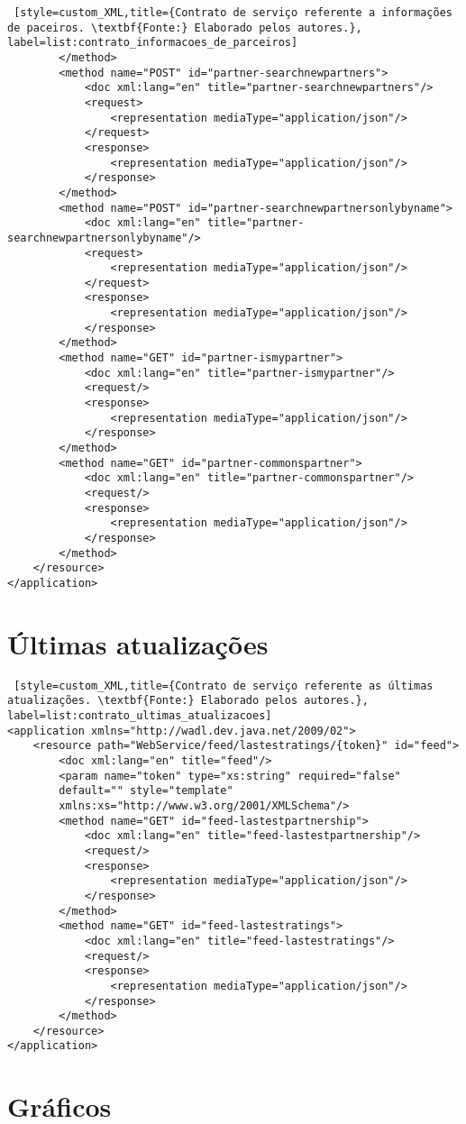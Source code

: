 \begin{lstlisting} [style=custom_XML,title={Contrato de serviço referente a informações de paceiros. \textbf{Fonte:} Elaborado pelos autores.}, label=list:contrato_informacoes_de_parceiros]
		</method>
		<method name="POST" id="partner-searchnewpartners">
			<doc xml:lang="en" title="partner-searchnewpartners"/>
			<request>
				<representation mediaType="application/json"/>
			</request>
			<response>
				<representation mediaType="application/json"/>
			</response>
		</method>
		<method name="POST" id="partner-searchnewpartnersonlybyname">
			<doc xml:lang="en" title="partner-searchnewpartnersonlybyname"/>
			<request>
				<representation mediaType="application/json"/>
			</request>
			<response>
				<representation mediaType="application/json"/>
			</response>
		</method>
		<method name="GET" id="partner-ismypartner">
			<doc xml:lang="en" title="partner-ismypartner"/>
			<request/>
			<response>
				<representation mediaType="application/json"/>
			</response>
		</method>
		<method name="GET" id="partner-commonspartner">
			<doc xml:lang="en" title="partner-commonspartner"/>
			<request/>
			<response>
				<representation mediaType="application/json"/>
			</response>
		</method>
	</resource>
</application>
\end{lstlisting}


\section*{Últimas atualizações}

\begin{lstlisting} [style=custom_XML,title={Contrato de serviço referente as últimas atualizações. \textbf{Fonte:} Elaborado pelos autores.}, label=list:contrato_ultimas_atualizacoes] 	
<application xmlns="http://wadl.dev.java.net/2009/02">
	<resource path="WebService/feed/lastestratings/{token}" id="feed">
		<doc xml:lang="en" title="feed"/>
		<param name="token" type="xs:string" required="false" 
		default="" style="template" 
		xmlns:xs="http://www.w3.org/2001/XMLSchema"/>
		<method name="GET" id="feed-lastestpartnership">
			<doc xml:lang="en" title="feed-lastestpartnership"/>
			<request/>
			<response>
				<representation mediaType="application/json"/>
			</response>
		</method>
		<method name="GET" id="feed-lastestratings">
			<doc xml:lang="en" title="feed-lastestratings"/>
			<request/>
			<response>
				<representation mediaType="application/json"/>
			</response>
		</method>
	</resource>
</application>
\end{lstlisting}

\section*{Gráficos}

